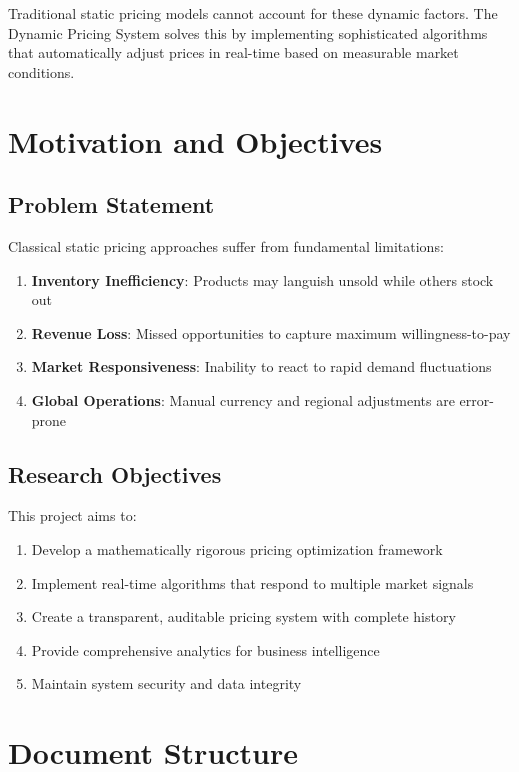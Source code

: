 \documentclass[12pt,a4paper,oneside]{report}
\begin{document}
Traditional static pricing models cannot account for these dynamic factors. The Dynamic Pricing System solves this by implementing sophisticated algorithms that automatically adjust prices in real-time based on measurable market conditions.

\section{Motivation and Objectives}

\subsection{Problem Statement}

Classical static pricing approaches suffer from fundamental limitations:

\begin{enumerate}
    \item \textbf{Inventory Inefficiency}: Products may languish unsold while others stock out
    \item \textbf{Revenue Loss}: Missed opportunities to capture maximum willingness-to-pay
    \item \textbf{Market Responsiveness}: Inability to react to rapid demand fluctuations
    \item \textbf{Global Operations}: Manual currency and regional adjustments are error-prone
\end{enumerate}

\subsection{Research Objectives}

This project aims to:

\begin{enumerate}
    \item Develop a mathematically rigorous pricing optimization framework
    \item Implement real-time algorithms that respond to multiple market signals
    \item Create a transparent, auditable pricing system with complete history
    \item Provide comprehensive analytics for business intelligence
    \item Maintain system security and data integrity
\end{enumerate}

\section{Document Structure}
\end{document}
